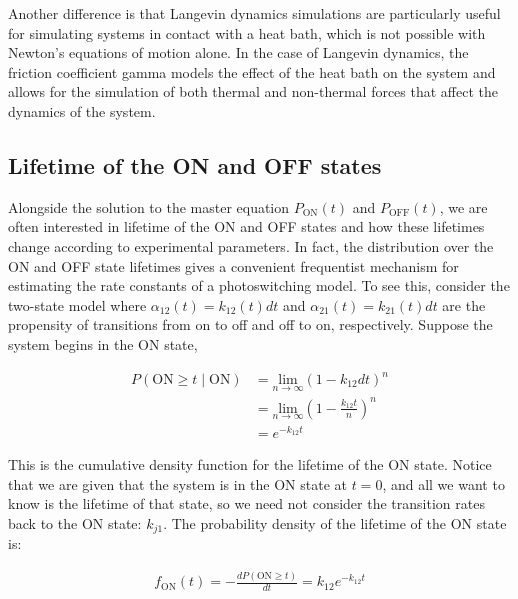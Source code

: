 \documentclass{ucetd}
\begin{document}
Another difference is that Langevin dynamics simulations are particularly useful for simulating systems in contact with a heat bath, which is not possible with Newton's equations of motion alone. In the case of Langevin dynamics, the friction coefficient gamma models the effect of the heat bath on the system and allows for the simulation of both thermal and non-thermal forces that affect the dynamics of the system.




\begin{appendices}



\subsection{Lifetime of the ON and OFF states}

Alongside the solution to the master equation $P_{\mathrm{ON}}(t)$ and $P_{\mathrm{OFF}}(t)$, we are often interested in lifetime of the ON and OFF states and how these lifetimes change according to experimental parameters. In fact, the distribution over the ON and OFF state lifetimes gives a convenient frequentist mechanism for estimating the rate constants of a photoswitching model. To see this, consider the two-state model where $\alpha_{12}(t) = k_{12}(t)dt$ and $\alpha_{21}(t) = k_{21}(t)dt$ are the propensity of transitions from on to off and off to on, respectively. Suppose the system begins in the ON state, 

\begin{align*}
P(\mathrm{ON} \geq t \; | \;\mathrm{ON}) &= \underset{n\rightarrow\infty}{\mathrm{lim}}\left(1-k_{12}dt\right)^{n}\\
&= \underset{n\rightarrow\infty}{\mathrm{lim}}\left(1-\frac{k_{12}t}{n}\right)^{n}\\
&= e^{-k_{12}t}
\end{align*}

This is the cumulative density function for the lifetime of the ON state. Notice that we are given that the system is in the ON state at $t=0$, and all we want to know is the lifetime of that state, so we need not consider the transition rates back to the ON state: $k_{j1}$. The probability density of the lifetime of the ON state is: 

\begin{align*}
f_{\mathrm{ON}}(t) = -\frac{dP(\mathrm{ON} \geq t)}{dt} = k_{12}e^{-k_{12}t}
\end{align*}


\end{appendices}
\end{document}
